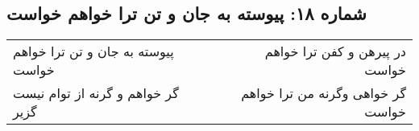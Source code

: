 \begin{center}
\section*{شماره ۱۸: پیوسته به جان و تن ترا خواهم خواست}
\label{sec:018}
\begin{longtable}{l p{0.5cm} r}
پیوسته به جان و تن ترا خواهم خواست
&&
در پیرهن و کفن ترا خواهم خواست
\\
گر خواهم و گرنه از توام نیست گزیر
&&
گر خواهی وگرنه من ترا خواهم خواست
\\
\end{longtable}
\end{center}
